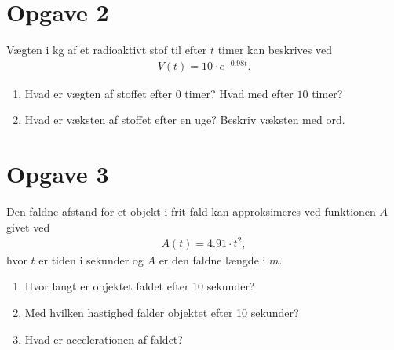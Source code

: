 \section*{Opgave 2}
Vægten i kg af et radioaktivt stof til efter $t$ timer kan beskrives ved
\begin{align*}
V(t) =10\cdot e^{-0.98t}.
\end{align*}
\begin{enumerate}
\item Hvad er vægten af stoffet efter $0$ timer? Hvad med efter $10$ timer?
\item Hvad er væksten af stoffet efter en uge? Beskriv væksten med ord.
\end{enumerate}
\section*{Opgave 3}
Den faldne afstand for et objekt i frit fald kan approksimeres ved funktionen $A$ givet ved
\begin{align*}
A(t) = 4.91 \cdot t^2, 
\end{align*}
hvor $t$ er tiden i sekunder og $A$ er den faldne længde i $m$.
\begin{enumerate}
\item Hvor langt er objektet faldet efter 10 sekunder?
\item Med hvilken hastighed falder objektet efter 10 sekunder?
\item Hvad er accelerationen af faldet?
\end{enumerate}

